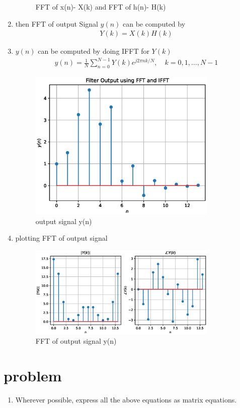 \documentclass[journal,12pt,twocolumn]{IEEEtran}
\renewcommand\thesection{\arabic{section}}
\begin{document}
\begin{enumerate}[label=\thesection.\arabic*.,ref=\thesection.\theenumi]
\begin{figure}[]
    \caption{FFT of x(n)- X(k) and FFT of h(n)- H(k) }
    \label{yn}
\end{figure}
\item then  FFT of output Signal $y(n)$ can be computed  by 
\begin{align}
    Y(k) = X(k)H(k)
\end{align}
\item $y(n)$ can be computed by doing IFFT for $Y(k)$
\begin{align}
    y(n) = \frac{1}{N}\sum_{n=0}^{N-1}Y(k) e^{j 2 \pi n k / N}, \quad k=0,1, \ldots, N-1
\end{align}
 \begin{figure}[h!]
    \centering
    \includegraphics[width=9cm]{figs/y_n.eps}
    \caption{output signal y(n)}
    \label{yn}
\end{figure}

\item plotting  FFT of output signal 
 \begin{figure}[h!]
    \centering
    \includegraphics[width=9cm]{figs/Y_1.eps}
    \caption{FFT of output signal y(n)}
    \label{yn}
\end{figure}
\end{enumerate}

\section{problem}
\begin{enumerate}[label=\thesection.\arabic*.,ref=\thesection.\theenumi]
    \item Wherever possible, express all the above equations as matrix equations.
\end{enumerate}
\end{document}
